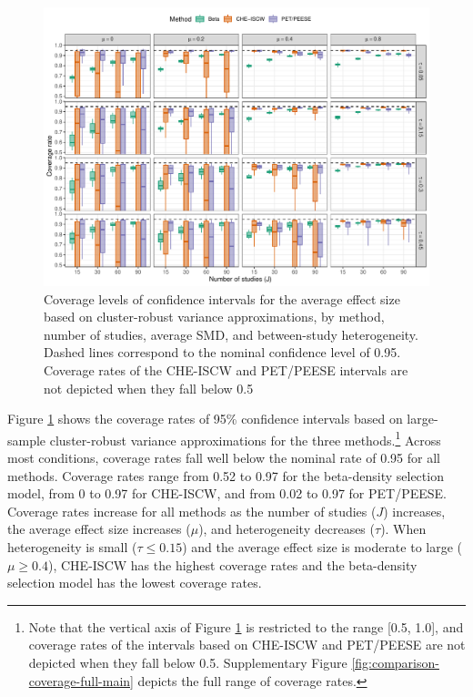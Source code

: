 \documentclass[
  man, donotrepeattitle,floatsintext]{apa7}
\begin{document}
\begin{figure}
\includegraphics{beta-function-selection-models-with-dependent-effects_files/figure-latex/comparison-coverage-main-1} \caption{Coverage levels of confidence intervals for the average effect size based on cluster-robust variance approximations, by method, number of studies, average SMD, and between-study heterogeneity. Dashed lines correspond to the nominal confidence level of 0.95. Coverage rates of the CHE-ISCW and PET/PEESE intervals are not depicted when they fall below 0.5}\label{fig:comparison-coverage-main}
\end{figure}

Figure \ref{fig:comparison-coverage-main} shows the coverage rates of 95\% confidence intervals based on large-sample cluster-robust variance approximations for the three methods.\footnote{Note that the vertical axis of Figure \ref{fig:comparison-coverage-main} is restricted to the range {[}0.5, 1.0{]}, and coverage rates of the intervals based on CHE-ISCW and PET/PEESE are not depicted when they fall below 0.5. Supplementary Figure \ref{fig:comparison-coverage-full-main} depicts the full range of coverage rates.}
Across most conditions, coverage rates fall well below the nominal rate of 0.95 for all methods.
Coverage rates range from 0.52 to 0.97 for the beta-density selection model, from 0 to 0.97 for CHE-ISCW, and from 0.02 to 0.97 for PET/PEESE.
Coverage rates increase for all methods as the number of studies (\(J\)) increases, the average effect size increases (\(\mu\)), and heterogeneity decreases (\(\tau\)).
When heterogeneity is small (\(\tau \leq 0.15\)) and the average effect size is moderate to large (\(\mu \geq 0.4\)), CHE-ISCW has the highest coverage rates and the beta-density selection model has the lowest coverage rates.
\end{document}
